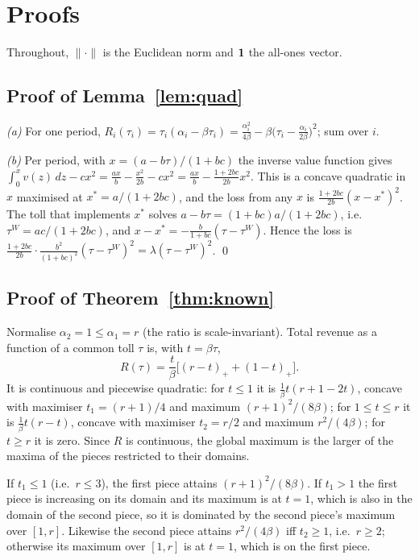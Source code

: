 \section{Proofs}\label{app:proofs}
Throughout, $\|\cdot\|$ is the Euclidean norm and $\mathbf{1}$ the all-ones vector.

\subsection{Proof of Lemma~\ref{lem:quad}}
\emph{(a)} For one period, $R_i(\tau_i)=\tau_i(\alpha_i-\beta\tau_i)=\frac{\alpha_i^2}{4\beta}-\beta\big(\tau_i-\frac{\alpha_i}{2\beta}\big)^2$; sum over $i$.

\emph{(b)} Per period, with $x=(a-b\tau)/(1+bc)$ the inverse value function gives $\int_0^xv(z)\,dz-cx^2=\frac{ax}{b}-\frac{x^2}{2b}-cx^2=\frac{ax}{b}-\frac{1+2bc}{2b}x^2$. This is a concave quadratic in $x$ maximised at $x^*=a/(1+2bc)$, and the loss from any $x$ is $\frac{1+2bc}{2b}(x-x^*)^2$. The toll that implements $x^*$ solves $a-b\tau=(1+bc)a/(1+2bc)$, i.e.\ $\tau^W=ac/(1+2bc)$, and $x-x^*=-\frac{b}{1+bc}(\tau-\tau^W)$. Hence the loss is $\frac{1+2bc}{2b}\cdot\frac{b^2}{(1+bc)^2}(\tau-\tau^W)^2=\lambda(\tau-\tau^W)^2$. \qed

\subsection{Proof of Theorem~\ref{thm:known}}
Normalise $\alpha_2=1\le\alpha_1=r$ (the ratio is scale-invariant). Total revenue as a function of a common toll $\tau$ is, with $t=\beta\tau$,
\[R(\tau)=\frac{t}{\beta}\Big[(r-t)_++(1-t)_+\Big].\]
It is continuous and piecewise quadratic: for $t\le1$ it is $\frac1\beta t(r+1-2t)$, concave with maximiser $t_1=(r+1)/4$ and maximum $(r+1)^2/(8\beta)$; for $1\le t\le r$ it is $\frac1\beta t(r-t)$, concave with maximiser $t_2=r/2$ and maximum $r^2/(4\beta)$; for $t\ge r$ it is zero. Since $R$ is continuous, the global maximum is the larger of the maxima of the pieces restricted to their domains.

If $t_1\le1$ (i.e.\ $r\le3$), the first piece attains $(r+1)^2/(8\beta)$. If $t_1>1$ the first piece is increasing on its domain and its maximum is at $t=1$, which is also in the domain of the second piece, so it is dominated by the second piece's maximum over $[1,r]$. Likewise the second piece attains $r^2/(4\beta)$ iff $t_2\ge1$, i.e.\ $r\ge2$; otherwise its maximum over $[1,r]$ is at $t=1$, which is on the first piece.

